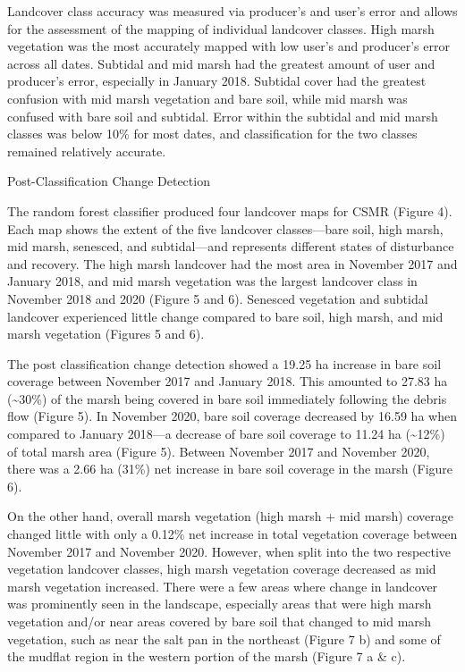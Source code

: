 \documentclass[
]{article}
\begin{document}
Landcover class accuracy was measured via producer's and user's error
and allows for the assessment of the mapping of individual landcover
classes. High marsh vegetation was the most accurately mapped with low
user's and producer's error across all dates. Subtidal and mid marsh had
the greatest amount of user and producer's error, especially in January
2018. Subtidal cover had the greatest confusion with mid marsh
vegetation and bare soil, while mid marsh was confused with bare soil
and subtidal. Error within the subtidal and mid marsh classes was below
10\% for most dates, and classification for the two classes remained
relatively accurate.

Post-Classification Change Detection

The random forest classifier produced four landcover maps for CSMR
(Figure 4). Each map shows the extent of the five landcover
classes---bare soil, high marsh, mid marsh, senesced, and subtidal---and
represents different states of disturbance and recovery. The high marsh
landcover had the most area in November 2017 and January 2018, and mid
marsh vegetation was the largest landcover class in November 2018 and
2020 (Figure 5 and 6). Senesced vegetation and subtidal landcover
experienced little change compared to bare soil, high marsh, and mid
marsh vegetation (Figures 5 and 6).

The post classification change detection showed a 19.25 ha increase in
bare soil coverage between November 2017 and January 2018. This amounted
to 27.83 ha (\textasciitilde30\%) of the marsh being covered in bare
soil immediately following the debris flow (Figure 5). In November 2020,
bare soil coverage decreased by 16.59 ha when compared to January
2018---a decrease of bare soil coverage to 11.24 ha
(\textasciitilde12\%) of total marsh area (Figure 5). Between November
2017 and November 2020, there was a 2.66 ha (31\%) net increase in bare
soil coverage in the marsh (Figure 6).

On the other hand, overall marsh vegetation (high marsh + mid marsh)
coverage changed little with only a 0.12\% net increase in total
vegetation coverage between November 2017 and November 2020. However,
when split into the two respective vegetation landcover classes, high
marsh vegetation coverage decreased as mid marsh vegetation increased.
There were a few areas where change in landcover was prominently seen in
the landscape, especially areas that were high marsh vegetation and/or
near areas covered by bare soil that changed to mid marsh vegetation,
such as near the salt pan in the northeast (Figure 7 b) and some of the
mudflat region in the western portion of the marsh (Figure 7 a \& c).
\end{document}
